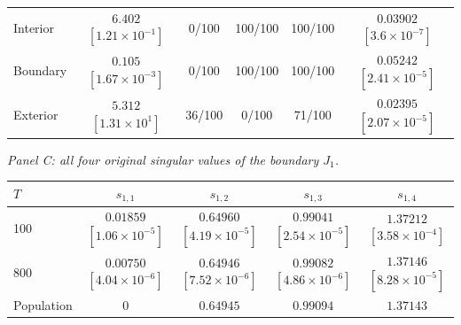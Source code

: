\documentclass[12pt,letterpaper]{article}
\theoremstyle{plain}
\theoremstyle{definition}
\begin{document}
\begin{table}[p]
\begin{adjustbox}{max width=\linewidth}
\begin{tabular}{lccccc}
\midrule
Interior & \shortstack{$6.402$\\{\scriptsize$[1.21\times10^{-1}]$}} & 0/100 & 100/100 & 100/100 & \shortstack{$0.03902$\\{\scriptsize$[3.6\times10^{-7}]$}}\\
Boundary & \shortstack{$0.105$\\{\scriptsize$[1.67\times10^{-3}]$}} & 0/100 & 100/100 & 100/100 & \shortstack{$0.05242$\\{\scriptsize$[2.41\times10^{-5}]$}}\\
Exterior & \shortstack{$5.312$\\{\scriptsize$[1.31\times10^{1}]$}} & 36/100 & 0/100 & 71/100 & \shortstack{$0.02395$\\{\scriptsize$[2.07\times10^{-5}]$}}\\
\bottomrule
\end{tabular}
\end{adjustbox}
\par\medskip
\textit{Panel C: all four original singular values of the boundary $J_1$.}\par\smallskip
\begin{adjustbox}{max width=\linewidth}
\begin{tabular}{lcccc}
\toprule
$T$ & $s_{1,1}$ & $s_{1,2}$ & $s_{1,3}$ & $s_{1,4}$\\
\midrule
100 & \shortstack{$0.01859$\\{\scriptsize$[1.06\times10^{-5}]$}} & \shortstack{$0.64960$\\{\scriptsize$[4.19\times10^{-5}]$}} & \shortstack{$0.99041$\\{\scriptsize$[2.54\times10^{-5}]$}} & \shortstack{$1.37212$\\{\scriptsize$[3.58\times10^{-4}]$}}\\
800 & \shortstack{$0.00750$\\{\scriptsize$[4.04\times10^{-6}]$}} & \shortstack{$0.64946$\\{\scriptsize$[7.52\times10^{-6}]$}} & \shortstack{$0.99082$\\{\scriptsize$[4.86\times10^{-6}]$}} & \shortstack{$1.37146$\\{\scriptsize$[8.28\times10^{-5}]$}}\\
Population & $0$ & $0.64945$ & $0.99094$ & $1.37143$\\
\bottomrule
\end{tabular}
\end{adjustbox}
\par\medskip
\begin{minipage}{0.96\linewidth}\footnotesize

\end{minipage}
\end{table}
\end{document}
